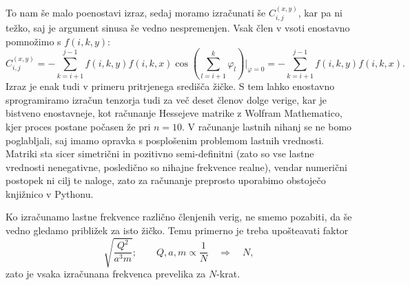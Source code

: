 \documentclass{article}
\begin{document}
To nam še malo poenostavi izraz, sedaj moramo izračunati še $C_{i,j}^{(x,y)}$, kar pa ni težko, saj je argument sinusa še vedno nespremenjen. Vsak člen v vsoti enostavno pomnožimo s $f(i,k,y)$:
\begin{equation}
    C_{i,j}^{(x,y)}=-\sum_{k=i+1}^{j-1}f(i,k,y)f(i,k,x)\cos\left(\sum_{l=i+1}^k\varphi_l\right)\Bigg|_{\varphi=0}=-\sum_{k=i+1}^{j-1}f(i,k,y)f(i,k,x).
\end{equation}
Izraz je enak tudi v primeru pritrjenega središča žičke. S tem lahko enostavno sprogramiramo izračun tenzorja tudi za več deset členov dolge verige, kar je bistveno enostavneje, kot računanje Hessejeve matrike z Wolfram Mathematico, kjer proces postane počasen že pri $n=10$. V računanje lastnih nihanj se ne bomo poglabljali, saj imamo opravka s posplošenim problemom lastnih vrednosti. Matriki sta sicer simetrični in pozitivno semi-definitni (zato so vse lastne vrednosti nenegativne, posledično so nihajne frekvence realne), vendar numerični postopek ni cilj te naloge, zato za računanje preprosto uporabimo obstoječo knjižnico v Pythonu.

Ko izračunamo lastne frekvence različno členjenih verig, ne smemo pozabiti, da še vedno gledamo približek za isto žičko. Temu primerno je treba upošteavati faktor
\begin{equation}
    \sqrt{\frac{Q^2}{a^3m}}; \qquad Q,a,m \propto \frac{1}{N}\quad\Rightarrow\quad N,
\end{equation}
zato je vsaka izračunana frekvenca prevelika za $N$-krat.
\end{document}
